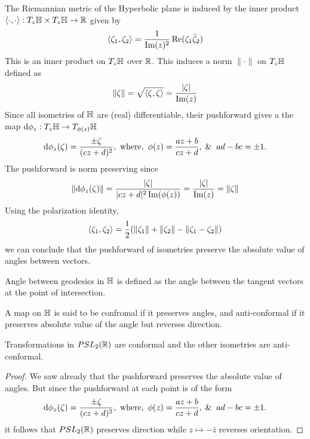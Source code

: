 The Riemannian metric of the Hyperbolic plane is induced by the inner product $\langle \cdot, \cdot \rangle: T_z\mathbb{H} \times T_z\mathbb{H} \to \mathbb{R}$ given by
\begin{align*}
  \langle \zeta_1, \zeta_2 \rangle = \frac{1}{\Im(z)^2} \Re(\zeta_1 \bar{\zeta}_2)
\end{align*}
This is an inner product on $T_z\mathbb{H}$ over $\mathbb{R}$. This induces a norm $\|\cdot\|$ on $T_z\mathbb{H}$ defined as
\begin{align*}
  \|\zeta\| = \sqrt{\langle \zeta, \zeta \rangle} = \frac{|\zeta|}{\Im(z)}
\end{align*}
Since all isometries of $\mathbb{H}$ are (real) differentiable, their pushforward gives a the map $\dd \phi_z : T_z\mathbb{H} \to T_{\phi(z)}\mathbb{H}$ 
\begin{align*}
  \dd\p_z(\zeta) = \f{\pm \zeta}{(cz+d)^2},\ \text{where},\ \p(z) = \f{az+b}{cz+d}, \And ad-bc = \pm 1. 
\end{align*}
The pushforward is norm preserving since
\begin{align*}
  \|\dd \phi_z(\zeta)\| = \frac{|\zeta|}{|cz+d|^2 \Im(\phi(z))} = \frac{|\zeta|}{\Im(z)} = \|\zeta\|
\end{align*}
Using the polarization identity,
\begin{align*}
  \langle \zeta_1, \zeta_2 \rangle = \frac{1}{2}(\|\zeta_1\| + \|\zeta_2\| - \|\zeta_1 - \zeta_2\|)
\end{align*}
we can conclude that the pushforward of isometries preserve the absolute value of angles between vectors.
\begin{definition}
  Angle between geodesics in $\mathbb{H}$ is defined as the angle between the tangent vectors at the point of intersection.
\end{definition}
\begin{definition}
  A map on $\mathbb{H}$ is said to be confromal if it preserves angles, and anti-conformal if it preserves absolute value of the angle but reverses direction.
\end{definition}
\begin{theorem}
  Transformations in $PSL_2(\mathbb{R})$ are conformal and the other isometries are anti-conformal.
\end{theorem}
\begin{proof}
  We saw already that the pushforward preserves the absolute value of angles. But since the pushforward at each point is of the form
  \begin{align*} 
  \dd\p_z(\zeta) = \f{\pm \zeta}{(cz+d)^2},\ \text{where},\ \p(z) = \f{az+b}{cz+d}, \And ad-bc = \pm 1. 
  \end{align*}
  it follows that $PSL_2(\mathbb{R})$ preserves direction while $z\mapsto -\bar{z}$ reverses orientation.
\end{proof}
